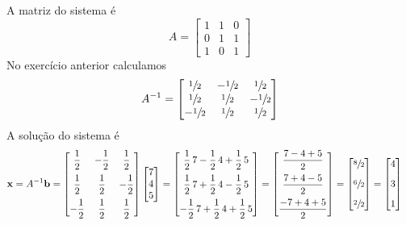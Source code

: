 \documentclass[a4paper,12pt,fleqn]{article}
\begin{document}
\begin{answer}
A matriz do sistema é
\[
  A =
  \begin{bmatrix}
    1 & 1 & 0 \\
    0 & 1 & 1 \\
    1 & 0 & 1
  \end{bmatrix}
\]
No exercício anterior calculamos
\[
  A^{-1} =
  \begin{bmatrix}
    \sfrac{1}{2}  & -\sfrac{1}{2} & \sfrac{1}{2}  \\
    \sfrac{1}{2}  & \sfrac{1}{2}  & -\sfrac{1}{2} \\
    -\sfrac{1}{2} & \sfrac{1}{2}  & \sfrac{1}{2}
  \end{bmatrix}
\]
A solução do sistema é
\begin{align*}
  \mathbf{x}
  & = A^{-1} \mathbf{b}
  =
    \begin{bmatrix}
       \dfrac{1}{2} & -\dfrac{1}{2} &  \dfrac{1}{2} \\[3mm]
       \dfrac{1}{2} &  \dfrac{1}{2} & -\dfrac{1}{2} \\[3mm]
      -\dfrac{1}{2} &  \dfrac{1}{2} &  \dfrac{1}{2}
    \end{bmatrix}
    \begin{bmatrix}
      7 \\
      4 \\
      5 \\
    \end{bmatrix}
  =
    \begin{bmatrix}
       \dfrac{1}{2}\, 7 - \dfrac{1}{2}\, 4 + \dfrac{1}{2}\, 5 \\[3mm]
       \dfrac{1}{2}\, 7 + \dfrac{1}{2}\, 4 - \dfrac{1}{2}\, 5 \\[3mm]
      -\dfrac{1}{2}\, 7 + \dfrac{1}{2}\, 4 + \dfrac{1}{2}\, 5
    \end{bmatrix}
  =
    \begin{bmatrix}
      \dfrac{ 7 - 4 + 5}{2} \\[3mm]
      \dfrac{ 7 + 4 - 5}{2} \\[3mm]
      \dfrac{-7 + 4 + 5}{2}
    \end{bmatrix}
  =
    \begin{bmatrix}
      \sfrac{8}{2} \\[3mm]
      \sfrac{6}{2} \\[3mm]
      \sfrac{2}{2}
    \end{bmatrix}
  =
    \begin{bmatrix}
      4 \\[3mm]
      3 \\[3mm]
      1
    \end{bmatrix}
\end{align*}
\end{answer}

\end{document}
